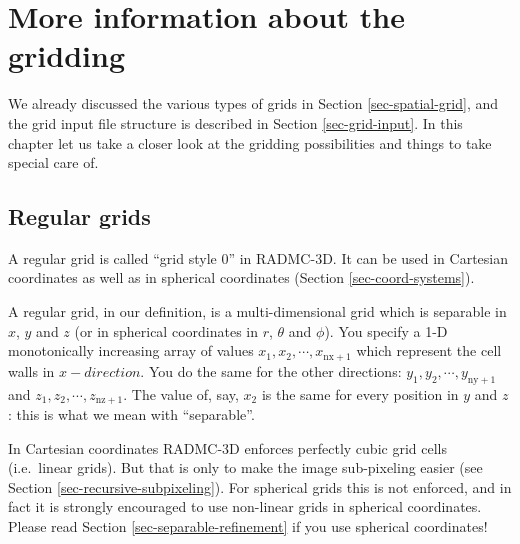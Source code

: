 \documentclass{report}
\begin{document}
\chapter{More information about the gridding}
\label{chap-gridding}
%
We already discussed the various types of grids in Section
\ref{sec-spatial-grid}, and the grid input file structure is described in
Section \ref{sec-grid-input}. In this chapter let us take a closer look
at the gridding possibilities and things to take special care of.


\section{Regular grids}
\label{sec-regular-grid}
A regular grid is called ``grid style 0'' in RADMC-3D. It can be used in
Cartesian coordinates as well as in spherical coordinates (Section
\ref{sec-coord-systems}).

A regular grid, in our definition, is a multi-dimensional grid which is
separable in $x$, $y$ and $z$ (or in spherical coordinates in $r$, $\theta$
and $\phi$). You specify a 1-D monotonically increasing array of values
$x_1, x_2,\cdots,x_{\mathrm{nx+1}}$ which represent the cell walls in
$x-direction$.  You do the same for the other directions: $y_1,
y_2,\cdots,y_{\mathrm{ny+1}}$ and $z_1, z_2,\cdots,z_{\mathrm{nz+1}}$.  The
value of, say, $x_2$ is the same for every position in $y$ and $z$: this is
what we mean with ``separable''.

In Cartesian coordinates RADMC-3D enforces perfectly cubic grid cells (i.e.\
linear grids). But that is only to make the image sub-pixeling easier (see
Section \ref{sec-recursive-subpixeling}). For spherical grids this is not
enforced, and in fact it is strongly encouraged to use non-linear grids in
spherical coordinates. Please read Section \ref{sec-separable-refinement}
if you use spherical coordinates!
\end{document}

